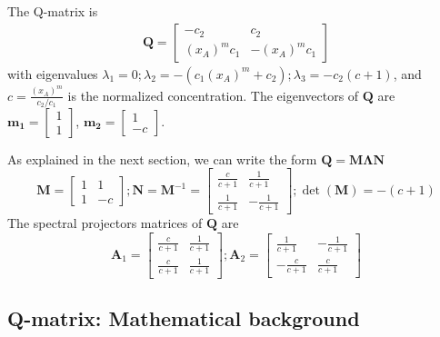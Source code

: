 The Q-matrix is
\begin{eqnarray}
  \label{eq:572}
  \mathbf{Q} = \left[
    \begin{array}{cc}
      -c_2 & c_2 \\
      (x_A)^m c_1 & -(x_A)^m c_1
    \end{array}
\right]
\end{eqnarray}
with eigenvalues $\lambda_1=0; \lambda_2=-(c_1 (x_A)^m+c_2);
\lambda_3=-c_2(c+1)$, and $c=\frac{(x_A)^m}{c_2/c_1}$ is the normalized
concentration.  The eigenvectors of
$\mathbf{Q}$ are $\mathbf{m_1}=\left[ \begin{array}{c}1\\1
\end{array}\right]$, $\mathbf{m_2}= \left[\begin{array}{c}1\\-c
\end{array}\right]$.

As explained in the next section, we can write the form $\mathbf{Q=M\Lambda N}$
\begin{equation}
\mathbf{M}=\left[\begin{array}{cc}
1 & 1 \\
1 & -c
\end{array} \right]; \mathbf{N}=\mathbf{M}^{-1} = \left[
\begin{array}{cc}
\frac{c}{c+1} & \frac{1}{c+1} \\
\frac{1}{c+1} & -\frac{1}{c+1}
\end{array}
\right]; \det(\mathbf{M})=-(c+1)
\end{equation}
The spectral projectors matrices of $\mathbf{Q}$ are
\begin{equation}
\mathbf{A}_1= \left[ \begin{array}{cc}
\frac{c}{c+1} & \frac{1}{c+1} \\
\frac{c}{c+1} & \frac{1}{c+1}
\end{array} \right];
\mathbf{A}_2= \left[ \begin{array}{cc}
\frac{1}{c+1} & -\frac{1}{c+1} \\
-\frac{c}{c+1} & \frac{c}{c+1}
\end{array} \right]
\end{equation}




\subsection{Q-matrix: Mathematical background}
\label{sec:q-matrix-approach}


